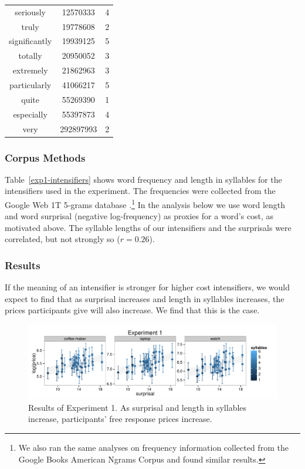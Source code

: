 \documentclass[10pt,letterpaper]{article}
\newcommand{\todo}[1]{{\color{red}#1}}
\begin{document}
\begin{table}[ht]
\begin{center}
\begin{tabular}{ccc}
    seriously & 12570333 & 4 \\
    truly & 19778608 & 2 \\
    significantly & 19939125 & 5 \\
    totally & 20950052 & 3 \\
    extremely & 21862963 & 3 \\
    particularly & 41066217 & 5 \\
    quite & 55269390 & 1 \\
    especially & 55397873 & 4 \\
    very & 292897993 & 2
  \end{tabular}
 \end{center}
\end{table}

\subsubsection{Corpus Methods}

Table~\ref{exp1-intensifiers} shows word frequency and length in syllables for the intensifiers used in the experiment.
The frequencies were collected from the Google Web 1T 5-grams database \cite{web1t5gram}.\footnote{
  We also ran the same analyses on frequency information collected from the Google Books American Ngrams Corpus \cite{books2011} and found similar results.
}
In the analysis below we use word length and word surprisal (negative log-frequency) as proxies for a word's cost, as motivated above.
The syllable lengths of our intensifiers and the surprisals %
were correlated, but not strongly so ($r = 0.26$).

\subsubsection{Results}

If the meaning of an intensifier is stronger for higher cost intensifiers, we would expect to find that as surprisal increases and length in syllables increases, the prices participants give will also increase. We find that this is the case.


\begin{figure}[ht]
\begin{center}
\includegraphics[width=\textwidth]{../analysis/output/Experiment1/scatter.pdf}
\end{center}
\caption{Results of Experiment 1. As surprisal and length in syllables increase, participants' free response prices increase.} 
\label{exp1-plot}
\end{figure}
\end{document}
